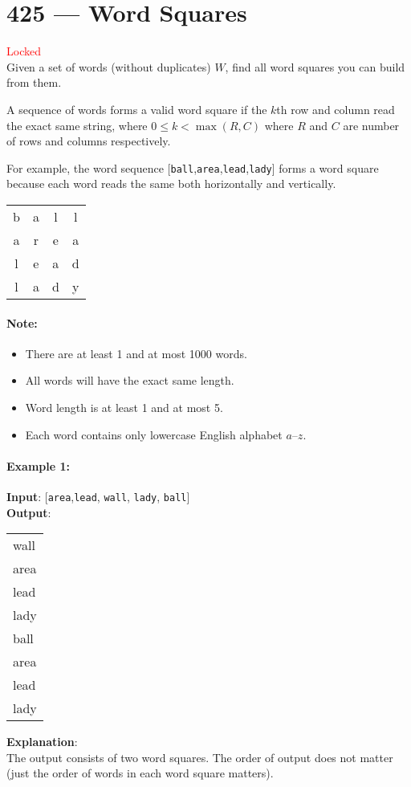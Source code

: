 \section{425 --- Word Squares}
\textcolor{red}{Locked}
\\
Given a set of words (without duplicates) $W$, find all word squares you can build from them.
\par
A sequence of words forms a valid word square if the $ k $th row and column read the exact same string, where $0 \leq k < \max(R, C)$ where $R$ and $C$ are number of rows and columns respectively.
\par
For example, the word sequence [\texttt{ball},\texttt{area},\texttt{lead},\texttt{lady}] forms a word square because each word reads the same both horizontally and vertically.
\begin{table}[H]
\begin{tabular}{cccc}
b & a & l & l\\
a & r & e & a\\
l & e & a & d\\
l & a & d & y
\end{tabular}
\end{table}

\paragraph{Note:}

\begin{itemize}
\item There are at least 1 and at most 1000 words.
\item All words will have the exact same length.
\item Word length is at least 1 and at most 5.
\item Each word contains only lowercase English alphabet $a$--$z$.
\end{itemize}
 

\paragraph{Example 1:}

\begin{flushleft}
\textbf{Input}: [\texttt{area},\texttt{lead}, \texttt{wall}, \texttt{lady}, \texttt{ball}]
\\
\textbf{Output}:
\begin{table}[H]
\begin{tabular}{l}
wall\\
area\\
lead\\
lady\\
\hline
\hline
ball\\
area\\
lead\\
lady
\end{tabular}
\end{table}
\textbf{Explanation}:
\\
The output consists of two word squares. The order of output does not matter (just the order of words in each word square matters).
\end{flushleft}


